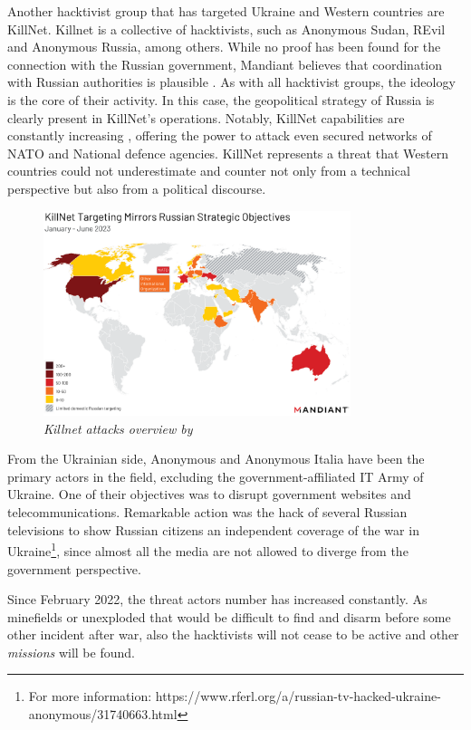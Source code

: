 Another hacktivist group that has targeted Ukraine and Western countries are KillNet. Killnet is a collective of hacktivists, such as Anonymous Sudan, REvil and Anonymous Russia, among others. While no proof has been found for the connection with the Russian government, Mandiant believes that coordination with Russian authorities is plausible \autocite{mandiant_2023_killnet}. As with all hacktivist groups, the ideology is the core of their activity. In this case, the geopolitical strategy of Russia is clearly present in KillNet’s operations. Notably, KillNet capabilities are constantly increasing \autocite{mandiant_2023_killnet}, offering the power to attack even secured networks of NATO and National defence agencies. KillNet represents a threat that Western countries could not underestimate and counter not only from a technical perspective but also from a political discourse. 

\begin{figure}[H]
\centering
\includegraphics[width=0.8\textwidth]{Images/killnet.png}
\caption{\textit{Killnet attacks overview by \textcite{mandiant_2023_killnet}}}
\label{killnet.png}
\end{figure}

From the Ukrainian side, Anonymous and Anonymous Italia have been the primary actors in the field, excluding the government-affiliated IT Army of Ukraine. One of their objectives was to disrupt government websites and telecommunications. Remarkable action was the hack of several Russian televisions to show Russian citizens an independent coverage of the war in Ukraine\footnote{For more information: https://www.rferl.org/a/russian-tv-hacked-ukraine-anonymous/31740663.html}, since almost all the media are not allowed to diverge from the government perspective. 

Since February 2022, the threat actors number has increased constantly. As minefields or unexploded that would be difficult to find and disarm before some other incident after war, also the hacktivists will not cease to be active and other \textit{missions} will be found. 

